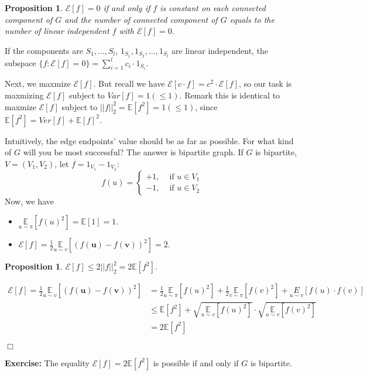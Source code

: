 \documentclass{article}
\newtheorem{proposition}[theorem]{Proposition}
\newenvironment{proof}{\noindent{\bf Proof:} \hspace*{1mm}}{
	\hspace*{\fill} $\Box$ }
\begin{document}
\begin{proposition}
  $\mathcal{E}[f] = 0$ if and only if $f$ is constant on each connected component of $G$ and the number of connected component of $G$ equals to the number of linear independent $f$ with $\mathcal{E}[f] = 0$.
\end{proposition}
If the components are $S_1, ..., S_l$, $1_{S_1}, 1_{S_2},...,1_{S_l}$ are linear independent, the subspace $\{f: \mathcal{E}[f]=0\} = \sum_{i=1}^{l} c_i \cdot 1_{S_i}$.
\par Next, we maxmize $\mathcal{E}[f]$. But recall we have $\mathcal{E}[c \cdot f] = c^2 \cdot \mathcal{E}[f]$, so our task is maxmizing $\mathcal{E}[f]$ subject to $Var[f] = 1 (\leq 1)$. Remark this is identical to maxmize $\mathcal{E}[f]$ subject to $||f||_2^2 = \mathbb{E}[f^2] = 1 (\leq 1)$, since $\mathbb{E}[f^2] = Ver[f] + \mathbb{E}[f]^2$.
\par Intuitively, the edge endpoints' value should be as far as possible. For what kind of $G$ will you be most successful? The answer is bipartite graph. If $G$ is bipartite, $V=(V_1, V_2)$, let $f=1_{V_1} - 1_{V_2}$:
$$
f(u)=\left\{
  \begin{array}{ll}
  +1, & \text { if } u \in V_1 \\
  -1, & \text { if } u \in V_2
  \end{array}
  \right.
$$
Now, we have
\begin{itemize}
  \item $\underset{u \sim \pi}{\mathbb{E}}[f(u)^2] = \mathbb{E}[1] = 1$.
  \item $\mathcal{E}[f] =\frac{1}{2} \underset{u \sim v}{\mathbb{E}}\left[(f(\boldsymbol{u})-f(\boldsymbol{v}))^{2}\right] = 2$.
\end{itemize}
\begin{proposition}
  $\mathcal{E}[f] \leq 2 ||f||_2^2 = 2 \mathbb{E}[f^2]$.
\end{proposition}
\begin{proof}
  \begin{align*}
    \mathcal{E}[f] =\frac{1}{2} \underset{u \sim v}{\mathbb{E}}\left[(f(\boldsymbol{u})-f(\boldsymbol{v}))^{2}\right] &= \frac{1}{2} \underset{u \sim \pi}{\mathbb{E}}[f(u)^2] + \frac{1}{2} \underset{v \sim \pi}{\mathbb{E}}[f(v)^2] + \underset{u \sim v}{E} [f(u) \cdot f(v)]\\
    & \leq \mathbb{E}[f^2] + \sqrt{\underset{u \sim v}{\mathbb{E}}[f(u)^2]} \cdot \sqrt{\underset{u \sim v}{\mathbb{E}}[f(v)^2]}\\
    &= 2 \mathbb{E}[f^2]
  \end{align*}
\end{proof}
\par \textbf{Exercise:} The equality $\mathcal{E}[f] = 2 \mathbb{E}[f^2]$ is possible if and only if $G$ is bipartite.

\end{document}
